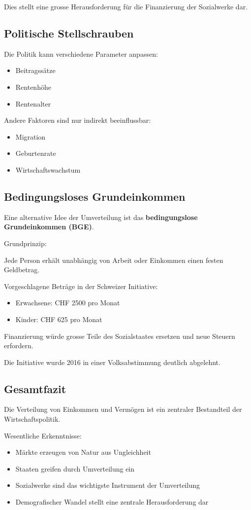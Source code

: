 Dies stellt eine grosse Herausforderung für die Finanzierung der Sozialwerke dar.

\subsection{Politische Stellschrauben}

Die Politik kann verschiedene Parameter anpassen:

\begin{itemize}
\item Beitragssätze
\item Rentenhöhe
\item Rentenalter
\end{itemize}

Andere Faktoren sind nur indirekt beeinflussbar:

\begin{itemize}
\item Migration
\item Geburtenrate
\item Wirtschaftswachstum
\end{itemize}

\subsection{Bedingungsloses Grundeinkommen}

Eine alternative Idee der Umverteilung ist das \textbf{bedingungslose Grundeinkommen (BGE)}.

Grundprinzip:

Jede Person erhält unabhängig von Arbeit oder Einkommen einen festen Geldbetrag.

Vorgeschlagene Beträge in der Schweizer Initiative:

\begin{itemize}
\item Erwachsene: CHF 2500 pro Monat
\item Kinder: CHF 625 pro Monat
\end{itemize}

Finanzierung würde grosse Teile des Sozialstaates ersetzen und neue Steuern erfordern.

Die Initiative wurde 2016 in einer Volksabstimmung deutlich abgelehnt.

\subsection{Gesamtfazit}

Die Verteilung von Einkommen und Vermögen ist ein zentraler Bestandteil der Wirtschaftspolitik.

Wesentliche Erkenntnisse:

\begin{itemize}
\item Märkte erzeugen von Natur aus Ungleichheit
\item Staaten greifen durch Umverteilung ein
\item Sozialwerke sind das wichtigste Instrument der Umverteilung
\item Demografischer Wandel stellt eine zentrale Herausforderung dar
\end{itemize}